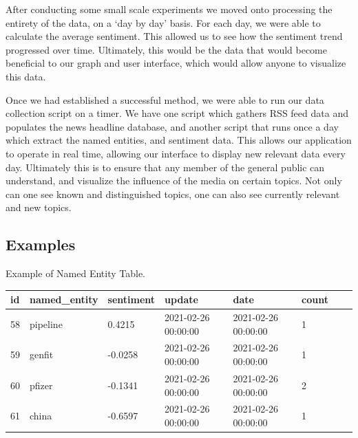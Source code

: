 \documentclass[12pt]{article}
\begin{document}
After conducting some small scale experiments we moved onto processing the entirety of the data, on a `day by day' basis. For each day, we were able to calculate the average sentiment. This allowed us to see how the sentiment trend progressed over time. Ultimately, this would be the data that would become beneficial to our graph and user interface, which would allow anyone to visualize this data. 

Once we had established a successful method, we were able to run our data collection script on a timer. We have one script which gathers RSS feed data and populates the news headline database, and another script that runs once a day which extract the named entities, and sentiment data. This allows our application to operate in real time, allowing our interface to display new relevant data every day. Ultimately this is to ensure that any member of the general public can understand, and visualize the influence of the media on certain topics. Not only can one see known and distinguished topics, one can also see currently relevant and new topics.

\clearpage

\subsection{Examples}

\hspace{\parindent} Example of Named Entity Table.
\begin{table}[H]
    \begin{tabular}{|l|l|l|l|l|l|l|l|}
        \hline
        id & named\_entity & sentiment & update & date & count    \\ \hline
        58             & pipeline       & 0.4215       & 2021-02-26 00:00:00       & 2021-02-26 00:00:00       & 1       \\ \hline
        59             & genfit       & -0.0258       & 2021-02-26 00:00:00       & 2021-02-26 00:00:00       & 1             \\ \hline
        60             & pfizer       & -0.1341       & 2021-02-26 00:00:00       & 2021-02-26 00:00:00       & 2        \\ \hline
        61            & china       & -0.6597       & 2021-02-26 00:00:00       & 2021-02-26 00:00:00       & 1       \\ \hline
    \end{tabular}
\end{table}
\end{document}
